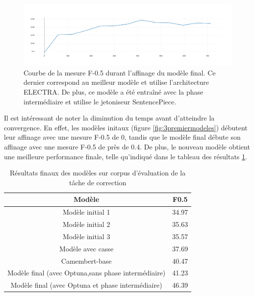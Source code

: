 \documentclass[12pt,twoside,maitrise]{dms}
\theoremstyle{definition}
\numberwithin{equation}{section}
\numberwithin{table}{chapter}
\numberwithin{figure}{chapter}
\begin{document}
\begin{figure}
	\begin{center}
		\includegraphics[width=1.0\textwidth]{figures/meilleurmodelenatf05.png}
	\end{center}
	\caption{Courbe de la mesure F-0.5 durant l'affinage du modèle final. Ce dernier correspond au meilleur modèle et utilise l'architecture ELECTRA. De plus, ce modèle a été entraîné avec la phase intermédiaire et utilise le jetoniseur SentencePiece.}\label{fig:meilleurmodeleaweb}
\end{figure}
Il est intéressant de noter la diminution du temps avant d'atteindre la
convergence. En effet, les modèles initaux (figure \ref{fig:3premiermodeles})
débutent leur affinage avec une mesure F-0.5 de 0, tandis que le modèle final
débute son affinage avec une mesure F-0.5 de près de 0.4. De plus, le nouveau
modèle obtient une meilleure performance finale, telle qu'indiqué dans le tableau des
résultats \ref{table:resultatfinaux}.
\begin{table}
	\centering
	\begin{tabular}{||c | c||}
		\hline
		Modèle                                              & F0.5  \\ [0.5ex]
		\hline\hline
		Modèle initial 1                                    & 34.97 \\
		Modèle initial 2                                    & 35.63 \\
		Modèle initial 3                                    & 35.57 \\
		Modèle avec casse                                   & 37.69 \\
		Camembert-base                                      & 40.47 \\
		Modèle final (avec Optuna,sans phase intermédiaire) & 41.23 \\
		Modèle final  (avec Optuna et phase intermédiaire)  & 46.39 \\
		\hline
	\end{tabular}
	\caption{Résultats finaux des modèles sur corpus d'évaluation de la tâche de correction}
	\label{table:resultatfinaux}
\end{table}
\end{document}
